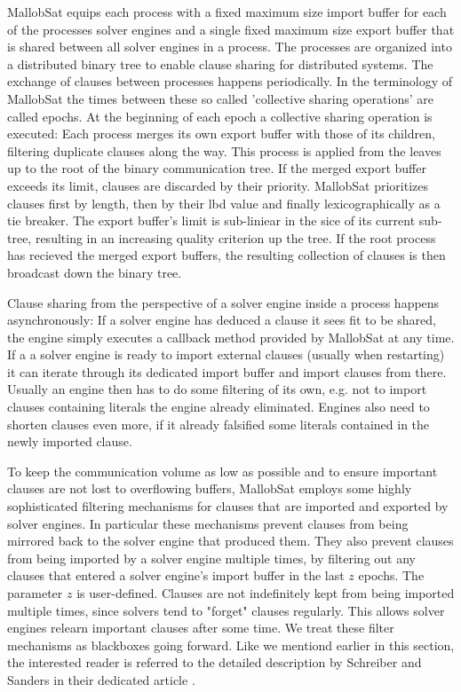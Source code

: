 \documentclass[12pt,a4paper,twoside]{scrartcl}
\numberwithin{equation}{section}
\begin{document}
MallobSat equips each process with a fixed maximum size import buffer for each of the processes solver engines and a single fixed maximum size export buffer that is shared between all solver engines in a process. The processes are organized into a distributed binary tree to enable clause sharing for distributed systems. The exchange of clauses between processes happens periodically. In the terminology of MallobSat the times between these so called 'collective sharing operations' are called epochs. At the beginning of each epoch a collective sharing operation is executed: Each process merges its own export buffer with those of its children, filtering duplicate clauses along the way. This process is applied from the leaves up to the root of the binary communication tree. If the merged export buffer exceeds its limit, clauses are discarded by their priority. MallobSat prioritizes clauses first by length, then by their lbd value and finally lexicographically as a tie breaker. The export buffer's limit is sub-liniear in the sice of its current sub-tree, resulting in an increasing quality criterion up the tree. If the root process has recieved the merged export buffers, the resulting collection of clauses is then broadcast down the binary tree.

Clause sharing from the perspective of a solver engine inside a process happens asynchronously: If a solver engine has deduced a clause it sees fit to be shared, the engine simply executes a callback method provided by MallobSat at any time. If a a solver engine is ready to import external clauses (usually when restarting) it can iterate through its dedicated import buffer and import clauses from there. Usually an engine then has to do some filtering of its own, e.g. not to import clauses containing literals the engine already eliminated. Engines also need to shorten clauses even more, if it already falsified some literals contained in the newly imported clause.

To keep the communication volume as low as possible and to ensure important clauses are not lost to overflowing buffers, MallobSat employs some highly sophisticated filtering mechanisms for clauses that are imported and exported by solver engines. In particular these mechanisms prevent clauses from being mirrored back to the solver engine that produced them. They also prevent clauses from being imported by a solver engine multiple times, by filtering out any clauses that entered a solver engine's import buffer in the last $z$ epochs. The parameter $z$ is user-defined. Clauses are not indefinitely kept from being imported multiple times, since solvers tend to "forget" clauses regularly. This allows solver engines relearn important clauses after some time. We treat these filter mechanisms as blackboxes going forward. Like we mentiond earlier in this section, the interested reader is referred to the detailed description by Schreiber and Sanders in their dedicated article \cite{mallobSat}.
\end{document}
